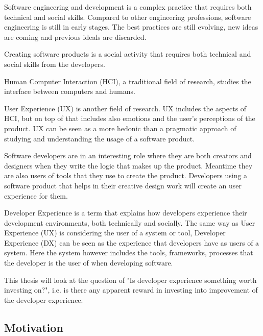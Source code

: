 \documentclass[english, 12pt, a4paper, sci, utf8, a-1b, online]{aaltothesis}
\begin{document}
Software engineering and development is a complex practice that requires both technical and social skills. Compared to other engineering professions, software engineering is still in early stages. The best practices are still evolving, new ideas are coming and previous ideals are discarded.

Creating software products is a social activity that requires both technical and social skills from the developers.

Human Computer Interaction (HCI), a traditional field of research, studies the interface between computers and humans.

User Experience (UX) is another field of research. UX includes the aspects of HCI, but on top of that includes also emotions and the user's perceptions of the product. UX can be seen as a more hedonic than a pragmatic approach of studying and understanding the usage of a software product.

Software developers are in an interesting role where they are both creators and designers when they write the logic that makes up the product. Meantime they are also users of tools that they use to create the product. Developers using a software product that helps in their creative design work will create an user experience for them.

Developer Experience is a term that explains how developers experience their development environments, both technically and socially. The same way as User Experience (UX) is considering the user of a system or tool, Developer Experience (DX) can be seen as the experience that developers have as users of a system. Here the system however includes the tools, frameworks, processes that the developer is the user of when developing software.

This thesis will look at the question of "Is developer experience something worth investing on?", i.e. is there any apparent reward in investing into improvement of the developer experience.

\thispagestyle{empty}

\subsection{Motivation}
\end{document}
